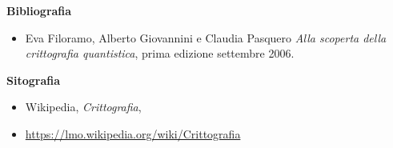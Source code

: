 \documentclass[a4paper, 12pt]{article}
\begin{document}
{\large \textbf{Bibliografia}\par}
\begin{itemize}
    \item Eva Filoramo, Alberto Giovannini e Claudia Pasquero \textit{Alla scoperta della crittografia quantistica}, prima edizione settembre 2006.
\end{itemize}

{\large \textbf{Sitografia}\par}
\begin{itemize}
    \item Wikipedia, \textit{Crittografia}, 
    \item[] \href{https://lmo.wikipedia.org/wiki/Crittografia}{https://lmo.wikipedia.org/wiki/Crittografia}
\end{itemize}
\end{document}
